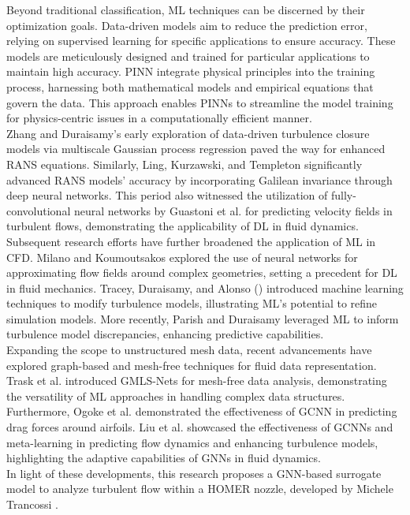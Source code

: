 Beyond traditional classification, ML techniques can be discerned by their optimization goals. Data-driven models aim to reduce the prediction error, relying on supervised learning for specific applications to ensure accuracy. These models are meticulously designed and trained for particular applications to maintain high accuracy. \gls{PINN} \cite{raissi2019physics} integrate physical principles into the training process, harnessing both mathematical models and empirical equations that govern the data. This approach enables PINNs to streamline the model training for physics-centric issues in a computationally efficient manner. \\
Zhang and Duraisamy’s early exploration \cite{zhang2015} of data-driven turbulence closure models via multiscale Gaussian process regression paved the way for enhanced RANS equations. Similarly, Ling, Kurzawski, and Templeton \cite{ling2016} significantly advanced  RANS models' accuracy by incorporating Galilean invariance through deep neural networks. This period also witnessed the utilization of fully-convolutional neural networks by Guastoni et al. \cite{guastoni2020} for predicting velocity fields in turbulent flows, demonstrating the applicability of DL in fluid dynamics.\\
Subsequent research efforts have further broadened the application of ML in CFD. Milano and Koumoutsakos \cite{milano2002} explored the use of neural networks for approximating flow fields around complex geometries, setting a precedent for DL in fluid mechanics. Tracey, Duraisamy, and Alonso (\cite{tracey2013}) introduced machine learning techniques to modify turbulence models, illustrating ML's potential to refine simulation models. More recently, Parish and Duraisamy \cite{parish2016} leveraged ML to inform turbulence model discrepancies, enhancing predictive capabilities.\\
Expanding the scope to unstructured mesh data, recent advancements have explored graph-based and mesh-free techniques for fluid data representation. Trask et al. \cite{trask2019} introduced GMLS-Nets for mesh-free data analysis, demonstrating the versatility of ML approaches in handling complex data structures. Furthermore, Ogoke et al. \cite{ogoke2020} demonstrated the effectiveness of \gls{GCNN} in predicting drag forces around airfoils. Liu et al. \cite{metalearning} showcased the effectiveness of GCNNs and meta-learning in predicting flow dynamics and enhancing turbulence models, highlighting the adaptive capabilities of GNNs in fluid dynamics.\\
In light of these developments, this research proposes a GNN-based surrogate model to analyze turbulent flow within a \gls{HOMER} nozzle, developed by Michele Trancossi \cite{trandum}.

